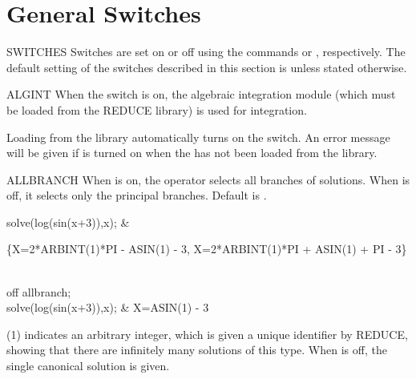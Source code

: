 \section{General Switches}

\begin{Introduction}{SWITCHES}
Switches are set on or off using the commands  or
, respectively.
The default setting of the switches described in this section is
 unless stated otherwise. 
\end{Introduction}

\begin{Switch}{ALGINT}
When the  switch is on, the algebraic integration module (which
must be loaded from the REDUCE library) is used for integration.

\begin{Comments}
Loading  from the library automatically turns on the
 switch.  An error message will be given if  is
turned on when the  has not been loaded from the library.
\end{Comments}
\end{Switch}


\begin{Switch}{ALLBRANCH}
When  is on, the operator  selects all 
branches of solutions. 
When  is off, it selects only the principal
branches.  Default is .

\begin{Examples}

solve(log(sin(x+3)),x);    &
\begin{multilineoutput}{6cm}
\{X=2*ARBINT(1)*PI - ASIN(1) - 3,
 X=2*ARBINT(1)*PI + ASIN(1) + PI - 3\}
\end{multilineoutput}\\
off allbranch; \\
solve(log(sin(x+3)),x);    &
                 {X=ASIN(1) - 3}
\end{Examples}

\begin{Comments}
(1) indicates an arbitrary integer, which is given a
unique identifier by REDUCE, showing that there are infinitely many
solutions of this type.  When  is off, the single
canonical solution is given.
\end{Comments}
\end{Switch}


